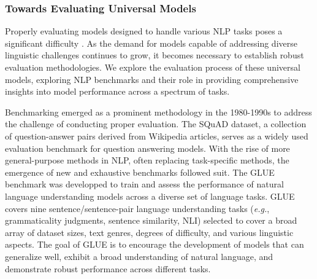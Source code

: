\subsubsection{Towards Evaluating Universal Models}

Properly evaluating models designed to handle various \ac{NLP} tasks poses a significant difficulty \citep{jones2005some}. As the demand for models capable of addressing diverse linguistic challenges continues to grow, it becomes necessary to establish robust evaluation methodologies. We explore the evaluation process of these universal models, exploring \ac{NLP} benchmarks and their role in providing comprehensive insights into model performance across a spectrum of tasks.

Benchmarking emerged as a prominent methodology in the 1980-1990s to address the challenge of conducting proper evaluation. 
The \ac{SQuAD} \citep{rajpurkar2016squad} dataset, a collection of question-answer pairs derived from Wikipedia articles, serves as a widely used evaluation benchmark for question answering models. 
With the rise of more general-purpose methods in \ac{NLP}, often replacing task-specific methods, the emergence of new and exhaustive benchmarks followed suit. The \ac{GLUE} benchmark \citep{wang2018glue} was developped to train and assess the performance of natural language understanding models across a diverse set of language tasks. \ac{GLUE} covers nine sentence/sentence-pair language understanding tasks (\textit{e.g.}, grammaticality judgments, sentence similarity, \ac{NLI}) selected to cover a broad array of dataset sizes, text genres, degrees of difficulty, and various linguistic aspects. The goal of \ac{GLUE} is to encourage the development of models that can generalize well, exhibit a broad understanding of natural language, and demonstrate robust performance across different tasks. 
